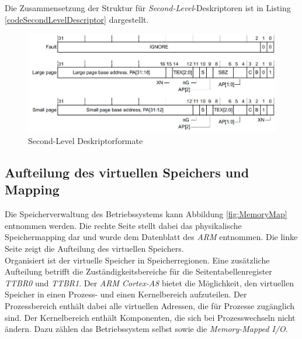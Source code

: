 Die Zusammensetzung der Struktur für \textit{Second-Level}-Deskriptoren ist in Listing \ref{codeSecondLevelDescriptor} dargestellt.\\

\begin{figure}[H]
	\includegraphics[scale=0.7]{chapters/mmu/figures/secondLevelDescriptor}
	\caption{Second-Level Deskriptorformate \cite[S. B3-1327]{ARM:ARM}}
	\label{fig:secondLevelDescriptor}
\end{figure}





\subsection{Aufteilung des virtuellen Speichers und Mapping}
\label{subsect:memoryMapping}

Die Speicherverwaltung des Betriebssystems kann Abbildung \ref{fig:MemoryMap} entnommen werden. Die rechte Seite stellt dabei das physikalische Speichermapping dar und wurde dem Datenblatt des \textit{ARM} \cite[S. 155]{ARM:TRM} entnommen. Die linke Seite zeigt die Aufteilung des virtuellen Speichers.\\

Organisiert ist der virtuelle Speicher in Speicherregionen. Eine zusätzliche Aufteilung betrifft die Zuständigkeitsbereiche für die Seitentabellenregister \textit{TTBR0} und \textit{TTBR1}. Der \textit{ARM Cortex-A8} bietet die Möglichkeit, den virtuellen Speicher in einen Prozess- und einen Kernelbereich aufzuteilen. Der Prozessbereich enthält dabei alle virtuellen Adressen, die für Prozesse zugänglich sind. Der Kernelbereich enthält Komponenten, die sich bei Prozesswechseln nicht ändern. Dazu zählen das Betriebssystem selbst sowie die \textit{Memory-Mapped I/O}. \\ 

